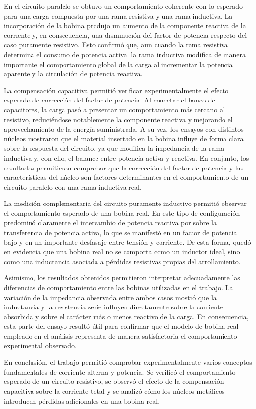 En el circuito paralelo se obtuvo un comportamiento coherente con lo esperado para una carga compuesta por una rama resistiva y una rama inductiva. La incorporación de la bobina produjo un aumento de la componente reactiva de la corriente y, en consecuencia, una disminución del factor de potencia respecto del caso puramente resistivo. Esto confirmó que, aun cuando la rama resistiva determina el consumo de potencia activa, la rama inductiva modifica de manera importante el comportamiento global de la carga al incrementar la potencia aparente y la circulación de potencia reactiva.

La compensación capacitiva permitió verificar experimentalmente el efecto esperado de corrección del factor de potencia. Al conectar el banco de capacitores, la carga pasó a presentar un comportamiento más cercano al resistivo, reduciéndose notablemente la componente reactiva y mejorando el aprovechamiento de la energía suministrada. A su vez, los ensayos con distintos núcleos mostraron que el material insertado en la bobina influye de forma clara sobre la respuesta del circuito, ya que modifica la impedancia de la rama inductiva y, con ello, el balance entre potencia activa y reactiva. En conjunto, los resultados permitieron comprobar que la corrección del factor de potencia y las características del núcleo son factores determinantes en el comportamiento de un circuito paralelo con una rama inductiva real.

La medición complementaria del circuito puramente inductivo permitió observar el comportamiento esperado de una bobina real. En este tipo de configuración predominó claramente el intercambio de potencia reactiva por sobre la transferencia de potencia activa, lo que se manifestó en un factor de potencia bajo y en un importante desfasaje entre tensión y corriente. De esta forma, quedó en evidencia que una bobina real no se comporta como un inductor ideal, sino como una inductancia asociada a pérdidas resistivas propias del arrollamiento.

Asimismo, los resultados obtenidos permitieron interpretar adecuadamente las diferencias de comportamiento entre las bobinas utilizadas en el trabajo. La variación de la impedancia observada entre ambos casos mostró que la inductancia y la resistencia serie influyen directamente sobre la corriente absorbida y sobre el carácter más o menos reactivo de la carga. En consecuencia, esta parte del ensayo resultó útil para confirmar que el modelo de bobina real empleado en el análisis representa de manera satisfactoria el comportamiento experimental observado.

En conclusión, el trabajo permitió comprobar experimentalmente varios conceptos fundamentales de corriente alterna y potencia. Se verificó el comportamiento esperado de un circuito resistivo, se observó el efecto de la compensación capacitiva sobre la corriente total y se analizó cómo los núcleos metálicos introducen pérdidas adicionales en una bobina real.
\newpage
